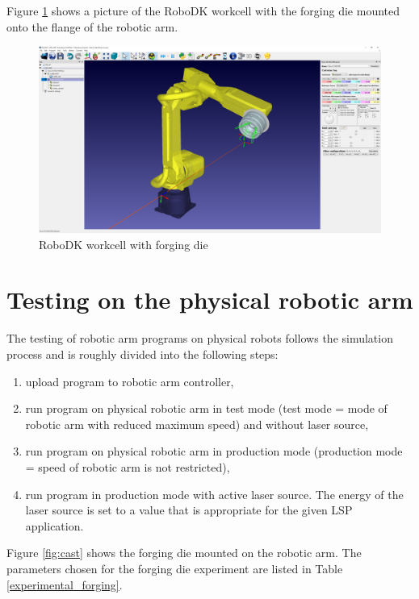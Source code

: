 Figure \ref{fig:robodk_die} shows a picture of the RoboDK workcell with the forging die mounted onto the flange of the robotic arm.

\begin{figure}[h]
    \centering
    \includegraphics[width=0.9\linewidth]{img/robodk_cast.PNG}
    \caption{RoboDK workcell with forging die}
    \label{fig:robodk_die}
\end{figure}


\section{Testing on the physical robotic arm}

The testing of robotic arm programs on physical robots follows the simulation process and is roughly divided into the following steps:

\begin{enumerate}
    
\item upload program to robotic arm controller,

\item run program on physical robotic arm in test mode (test mode = mode of robotic arm with reduced maximum speed) and without laser source,

\item run program on physical robotic arm in production mode (production mode = speed of robotic arm is not restricted),

\item run program in production mode with active laser source. The energy of the laser source is set to a value that is appropriate for the given LSP application. 

\end{enumerate}

Figure \ref{fig:cast} shows the forging die mounted on the robotic arm. The parameters chosen for the forging die experiment are listed in Table \ref{experimental_forging}. 

